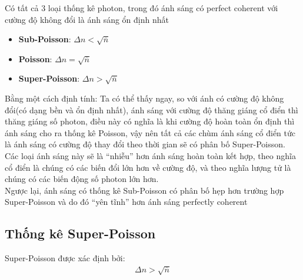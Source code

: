 \documentclass{report}
\newcommand{\q}[1]{``#1''}
\begin{document}
Có tất cả 3 loại thống kê photon, trong đó ánh sáng có perfect coherent với cường độ không đổi là ánh sáng ổn định nhất
\begin{itemize}
	\item \textbf{Sub-Poisson}: $\Delta n < \sqrt{\overline{n}}$
	\item \textbf{Poisson}: $\Delta n = \sqrt{\overline{n}}$
	\item \textbf{Super-Poisson}: $\Delta n > \sqrt{\overline{n}}$
\end{itemize}
Bằng một cách định tính: Ta có thể thấy ngay, so với ánh có cường độ không đổi(có dạng bền và ổn định nhất), ánh sáng với cường độ thăng giáng cổ điển thì thăng giáng số photon, điều này có nghĩa là khi cường độ hoàn toàn ổn định thì ánh sáng cho ra thống kê Poisson, vậy nên tất cả các chùm ánh sáng cổ điển tức là ánh sáng có cường độ thay đổi theo thời gian sẽ có phân bố Super-Poisson. Các loại ánh sáng này sẽ là \q{nhiễu} hơn ánh sáng hoàn toàn kết hợp, theo nghĩa cổ điển là chúng có các biến đổi lớn hơn về cường độ, và theo nghĩa lượng tử là chúng có các biến động số photon lớn hơn.\\
Ngược lại, ánh sáng có thống kê Sub-Poisson có phân bố hẹp hơn trường hợp Super-Poisson và do đó \q{yên tĩnh} hơn ánh sáng perfectly coherent
\subsection{Thống kê Super-Poisson}
Super-Poisson được xác định bởi:
\begin{gather}
	\Delta n > \sqrt{\overline{n}}
\end{gather}
\end{document}
